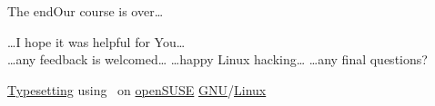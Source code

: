 \documentclass[hyperref={bookmarks=true, unicode=true, colorlinks=true, pdftitle={Linux, command line and MetaCentrum}, plainpages=false, pdfauthor={Vojtech Zeisek}, pdfsubject={Course about use of Linux command line, writing shell scripts and using MetaCentrum of CESNET}, pdfcreator={XeLaTeX, http://www.xelatex.org/}, pdfkeywords={Linux, GNU, BASH, shell, command line, MetaCentrum}, linkcolor=Sienna, anchorcolor=black, citecolor=green, filecolor=magenta, menucolor=Sienna, urlcolor=cyan, pdftex}, compress, ucs, xelatex, xcolor=svgnames, 11pt]{beamer}
\begin{document}
% 
% 
% 
% 

\begin{frame}{The end}{Our course is over\ldots}
\begin{center}
  \ldots I hope it was helpful for You\ldots\\
  \vfill
  \ldots any feedback is welcomed\ldots
  \vfill
  \ldots happy Linux hacking\ldots
  \vfill
  \ldots any final questions?
  \vfill
\end{center}
\begin{flushright}
  \begin{tiny}
   \href{http://www.xelatex.org/}{Typesetting} using \XeLaTeX~on \href{http://www.opensuse.org/}{openSUSE} \href{https://en.wikipedia.org/wiki/GNU}{GNU}/\href{https://en.wikipedia.org/wiki/Linux}{Linux}
  \end{tiny}
\end{flushright}
\end{frame}
\end{document}
